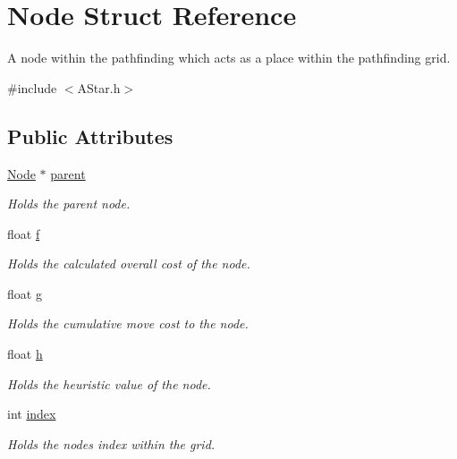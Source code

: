 \hypertarget{struct_node}{}\section{Node Struct Reference}
\label{struct_node}


A node within the pathfinding which acts as a place within the pathfinding grid.  




{\ttfamily \#include $<$A\+Star.\+h$>$}

\subsection*{Public Attributes}
\begin{DoxyCompactItemize}
\item 
\hyperlink{struct_node}{Node} $\ast$ \hyperlink{struct_node_ad8184598cdea70e4bbdfd76f2b0f9e85}{parent}
\begin{DoxyCompactList}\small\item\em Holds the parent node. \end{DoxyCompactList}\item 
float \hyperlink{struct_node_ad16e9a3090431644ea3283b07c91a6a4}{f}
\begin{DoxyCompactList}\small\item\em Holds the calculated overall cost of the node. \end{DoxyCompactList}\item 
float \hyperlink{struct_node_a914881afe2945fb2e60eb68a6c223d30}{g}
\begin{DoxyCompactList}\small\item\em Holds the cumulative move cost to the node. \end{DoxyCompactList}\item 
float \hyperlink{struct_node_ab7d8a0250a536b3b221dd6d42e7630e0}{h}
\begin{DoxyCompactList}\small\item\em Holds the heuristic value of the node. \end{DoxyCompactList}\item 
int \hyperlink{struct_node_ac8055cdbda20cacce417192557741ab8}{index}
\begin{DoxyCompactList}\small\item\em Holds the nodes index within the grid. \end{DoxyCompactList}\end{DoxyCompactItemize}


